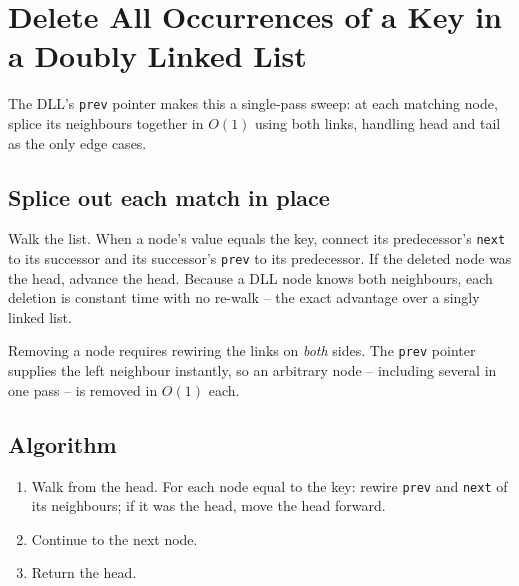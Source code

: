 \section{Delete All Occurrences of a Key in a Doubly Linked List}
\label{sec:ll-delete-occurrences-dll}


\begin{patternbox}
The DLL's \texttt{prev} pointer makes this a single-pass sweep: at each
matching node, splice its neighbours together in $O(1)$ using both links,
handling head and tail as the only edge cases.
\end{patternbox}

\subsection*{Splice out each match in place}

Walk the list. When a node's value equals the key, connect its predecessor's
\texttt{next} to its successor and its successor's \texttt{prev} to its
predecessor. If the deleted node was the head, advance the head. Because a
DLL node knows both neighbours, each deletion is constant time with no
re-walk -- the exact advantage over a singly linked list.

\begin{ideabox}
Removing a node requires rewiring the links on \emph{both} sides. The
\texttt{prev} pointer supplies the left neighbour instantly, so an arbitrary
node -- including several in one pass -- is removed in $O(1)$ each.
\end{ideabox}

\subsection*{Algorithm}

\begin{enumerate}
  \item Walk from the head. For each node equal to the key: rewire
        \texttt{prev} and \texttt{next} of its neighbours; if it was the
        head, move the head forward.
  \item Continue to the next node.
  \item Return the head.
\end{enumerate}

